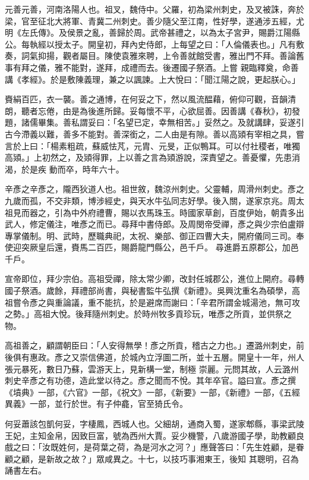 \begin{pinyinscope}
 元善元善，河南洛陽人也。祖叉，魏侍中。父羅，初為梁州刺史，及叉被誅，奔於梁，官至征北大將軍、青冀二州刺史。善少隨父至江南，性好學，遂通涉五經，尤明《左氏傳》。及侯景之亂，善歸於周。武帝甚禮之，以為太子宮尹，賜爵江陽縣公。每執經以授太子。開皇初，拜內史侍郎，上每望之曰：「人倫儀表也。」凡有敷奏，詞氣抑揚，觀者屬目。陳使袁雅來聘，上令善就館受書，雅出門不拜。善論舊事有拜之儀，雅不能對，遂拜，成禮而去。後遷國子祭酒。上嘗
 親臨釋奠，命善講《孝經》。於是敷陳義理，兼之以諷諫。上大悅曰：「聞江陽之說，更起朕心。」



 賚絹百匹，衣一襲。善之通博，在何妥之下，然以風流醖藉，俯仰可觀，音韻清朗，聽者忘倦，由是為後進所歸。妥每懷不平，心欲屈善。因善講《春秋》，初發題，諸儒畢集。善私謂妥曰：「名望已定，幸無相苦。」妥然之。及就講肆，妥遂引古今滯義以難，善多不能對。善深銜之，二人由是有隙。善以高熲有宰相之具，嘗言於上曰：「楊素粗疏，蘇威怯芃，元胄、元旻，正似鴨耳。可以付社稷者，唯獨高熲。」上初然之，及熲得罪，上以善之言為熲游說，深責望之。善憂懼，先患消渴，於是疾
 動而卒，時年六十。



 辛彥之辛彥之，隴西狄道人也。祖世敘，魏涼州刺史。父靈輔，周滑州刺史。彥之九歲而孤，不交非類，博涉經史，與天水牛弘同志好學。後入關，遂家京兆。周太祖見而器之，引為中外府禮曹，賜以衣馬珠玉。時國家草創，百度伊始，朝貴多出武人，修定儀注，唯彥之而已。尋拜中書侍郎。及周閔帝受禪，彥之與少宗伯盧辯專掌儀制。明、武時，歷職典祀，太祝、樂部、御正四曹大夫，開府儀同三司。奉使迎突厥皇后還，賚馬二百匹，賜爵龍門縣公，邑千戶。
 尋進爵五原郡公，加邑千戶。



 宣帝即位，拜少宗伯。高祖受禪，除太常少卿，改封任城郡公，進位上開府。尋轉國子祭酒。歲餘，拜禮部尚書，與秘書監牛弘撰《新禮》。吳興沈重名為碩學，高祖嘗令彥之與重論議，重不能抗，於是避席而謝曰：「辛君所謂金城湯池，無可攻之勢。」高祖大悅。後拜隨州刺史。於時州牧多貢珍玩，唯彥之所貢，並供祭之物。



 高祖善之，顧謂朝臣曰：「人安得無學！彥之所貢，稽古之力也。」遷潞州刺史，前後俱有惠政。彥之又崇信佛道，於城內立浮圖二所，並十五層。開皇十一年，州人張元暴死，數日乃蘇，雲游天上，見新構一堂，制極
 崇麗。元問其故，人云潞州刺史辛彥之有功德，造此堂以待之。彥之聞而不悅。其年卒官。謚曰宣。彥之撰《墳典》一部，《六官》一部，《祝文》一部，《新要》一部，《新禮》一部，《五經異義》一部，並行於世。有子仲龕，官至猗氏令。



 何妥蕭該包凱何妥，字棲鳳，西城人也。父細胡，通商入蜀，遂家郫縣，事梁武陵王妃，主知金帛，因致巨富，號為西州大賈。妥少機警，八歲游國子學，助教顧良戲之曰：「汝既姓何，是荷葉之荷，為是河水之河？」應聲答曰：「先生姓顧，是眷顧之顧，是新故之故？」眾咸異之。十七，以技巧事湘東王，後知
 其聰明，召為誦書左右。




\end{pinyinscope}
